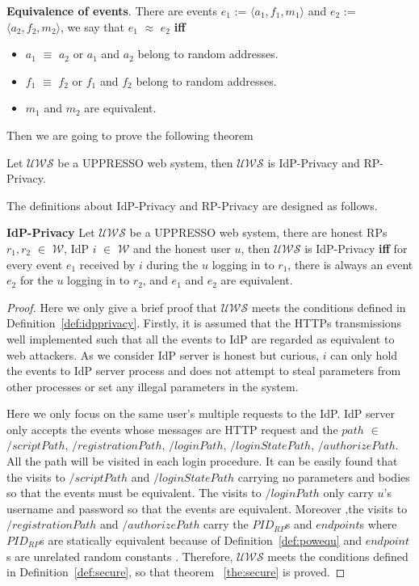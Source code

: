 \begin{definition}
\vspace{1mm}\noindent\textbf{Equivalence of events}. 
There are events $e_1$ := $\langle a_1, f_1, m_1 \rangle$ and $e_2$ := $\langle a_2, f_2, m_2 \rangle$, we say that $e_1$ $\approx$ $e_2$ \textbf{iff} 
\begin{itemize}
\item $a_1$ $\equiv$ $a_2$ or $a_1$ and $a_2$ belong to random addresses.
\item $f_1$ $\equiv$ $f_2$ or $f_1$ and $f_2$ belong to random addresses.
\item $m_1$ and $m_2$ are equivalent.
\end{itemize}
\label{def:eventequ}
\end{definition}

Then we are going to prove the following theorem
\begin{theorem}
Let  $\mathcal{UWS}$ be a UPPRESSO web system, then $\mathcal{UWS}$ is IdP-Privacy and RP-Privacy. 
\label{the:privacy}
\end{theorem}
The definitions about IdP-Privacy and RP-Privacy are designed as follows.
\begin{definition}
\vspace{1mm}\noindent\textbf{IdP-Privacy} Let  $\mathcal{UWS}$ be a UPPRESSO web system, there are honest RPs $r_1, r_2$ $\in$ $\mathcal{W}$, IdP $i$ $\in$ $\mathcal{W}$ and the honest user $u$, then $\mathcal{UWS}$ is IdP-Privacy \textbf{iff} for every event $e_1$ received by $i$ during the $u$ logging in to $r_1$, there is always an event $e_2$ for the $u$ logging in to $r_2$, and $e_1$ and $e_2$ are equivalent.
\label{def:idpprivacy}
\end{definition}
\begin{proof}
Here we only give a brief proof that $\mathcal{UWS}$ meets the conditions defined in Definition~\ref{def:idpprivacy}. 
Firstly, it is assumed that the HTTPs transmissions well implemented  such that all the events to IdP are regarded as equivalent to web attackers.
As we consider IdP server is honest but curious, $i$ can only hold the events to IdP server process and does not attempt to steal parameters from other processes or set any illegal parameters in the system. 

Here we only focus on the same user's multiple requests to the IdP.  IdP server only accepts the events whose messages are HTTP request and the $path$ $\in$ {$/scriptPath$, $/registrationPath$, $/loginPath$, $/loginStatePath$, $/authorizePath$}.
All the path will be visited in each login procedure. It can be easily found that the visits to $/scriptPath$ and $/loginStatePath$ carrying no parameters and bodies so that the events must be equivalent. The visits to $/loginPath$ only carry $u$'s username and password so that the events are equivalent. Moreover ,the visits to $/registrationPath$ and $/authorizePath$ carry the $PID_{RP}$s and $endpoint$s where $PID_{RP}$s are statically equivalent because of Definition~\ref{def:powequ} and $endpoint$s are unrelated random constants . Therefore, $\mathcal{UWS}$ meets the conditions defined in Definition~\ref{def:secure}, so that theorem ~\ref{the:secure} is proved. 
\end{proof}


